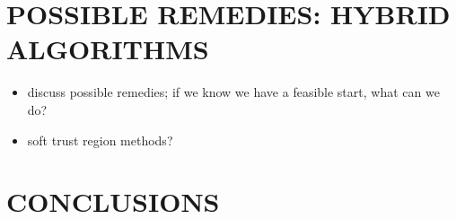 \documentclass[letterpaper, 10 pt, conference]{ieeeconf}
\begin{document}


\section{POSSIBLE REMEDIES: HYBRID ALGORITHMS}

\begin{itemize}
\item discuss possible remedies; if we know we have a feasible start, what can we do?
\item soft trust region methods?
\end{itemize}

\section{CONCLUSIONS}










\end{document}
